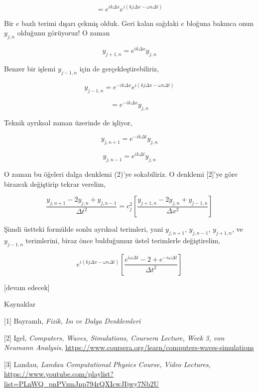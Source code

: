\documentclass[12pt,fleqn]{article}\usepackage{../../common}
\begin{document}
$$
= e^{i k \Delta x} e^{i(k j \Delta x - \omega n \Delta t)}
$$

Bir $e$ bazlı terimi dışarı çekmiş olduk. Geri kalan sağdaki $e$ bloğuna bakınca
onun $y_{j,n}$ olduğunu görüyoruz! O zaman 

$$
y_{j+1,n} = e^{i k \Delta x} y_{j,n}
$$

Benzer bir işlemi $y_{j-1,n}$ için de gerçekleştirebiliriz, 

$$
y_{j-1,n} = e^{-i k \Delta x} e^{i(k j \Delta x - \omega n \Delta t)}
$$

$$
 = e^{-i k \Delta x} y_{j,n}
$$

Teknik ayrıksal zaman üzerinde de işliyor,

$$
y_{j,n+1}  = e^{-i k \Delta t} y_{j,n}
$$

$$
y_{j,n-1}  = e^{i k \Delta t} y_{j,n}
$$

O zaman bu öğeleri dalga denklemi (2)'ye sokabiliriz. O denklemi [2]'ye göre
birazcık değiştirip tekrar verelim,

$$
\frac{y_{j,n+1} - 2 y_{j,n} + y_{j,n-1} }{\Delta t^2} =
c_j^2 \left[ \frac{ y_{j+1,n} - 2 y_{j,n} + y_{j-1,n} }{\Delta x^2}  \right]
$$

Şimdi üstteki formülde sonlu ayrıksal terimleri, yani $y_{j,n+1}$, $y_{j,n-1}$,
$y_{j+1,n}$, ve $y_{j-1,n}$ terimlerini, biraz önce bulduğumuz üstel terimlerle
değiştirelim,

$$
e^{i(k j \Delta x - \omega n \Delta t)} \left[
\frac{ e^{i\omega \Delta t} - 2  + e^{-i\omega \Delta t}  }
     {\Delta t^2}
\right]
$$


[devam edecek]

Kaynaklar

[1] Bayramlı, {\em Fizik, Isı ve Dalga Denklemleri}

[2] Igel, {\em Computers, Waves, Simulations, Coursera Lecture, Week 3, von Neumann Analysis},
    \url{https://www.coursera.org/learn/computers-waves-simulations}

[3] Landau, {\em Landau Computational Physics Course, Video Lectures},
    \url{https://www.youtube.com/playlist?list=PLnWQ_pnPVzmJnp794rQXIcwJIjwy7Nb2U}
\end{document}
